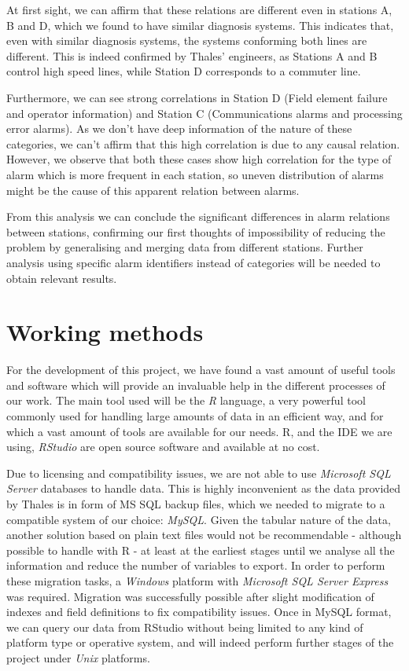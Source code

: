\clearpage

At first sight, we can affirm that these relations are different even in stations A, B and D, which we found to have similar diagnosis systems. This indicates that, even with similar diagnosis systems, the systems conforming both lines are different. This is indeed confirmed by Thales' engineers, as Stations A and B control high speed lines, while Station D corresponds to a commuter line.

Furthermore, we can see strong correlations in Station D (Field element failure and operator information) and Station C (Communications alarms and processing error alarms). As we don't have deep information of the nature of these categories, we can't affirm that this high correlation is due to any causal relation. However, we observe that both these cases show high correlation for the type of alarm which is more frequent in each station, so uneven distribution of alarms might be the cause of this apparent relation between alarms.

From this analysis we can conclude the significant differences in alarm relations between stations, confirming our first thoughts of impossibility of reducing the problem by generalising and merging data from different stations. Further analysis using specific alarm identifiers instead of categories will be needed to obtain relevant results.

\clearpage

\section{Working methods}
\label{sec:methods} For the development of this project, we have found a vast amount of useful tools and software which will provide an invaluable help in the different processes of our work. The main tool used will be the \emph{R} language\cite{ihaka1996r}, a very powerful tool commonly used for handling large amounts of data in an efficient way, and for which a vast amount of tools are available for our needs. R, and the IDE we are using, \emph{RStudio}\cite{racine2012rstudio} are open source software and available at no cost.

Due to licensing and compatibility issues, we are not able to use \emph{Microsoft SQL Server} databases to handle data. This is highly inconvenient as the data provided by Thales is in form of MS SQL backup files, which we needed to migrate to a compatible system of our choice: \emph{MySQL}. Given the tabular nature of the data, another solution based on plain text files would not be recommendable - although possible to handle with R - at least at the earliest stages until we analyse all the information and reduce the number of variables to export. In order to perform these migration tasks, a \emph{Windows} platform with \emph{Microsoft SQL Server Express} was required. Migration was successfully possible after slight modification of indexes and field definitions to fix compatibility issues. Once in MySQL format, we can query our data from RStudio without being limited to any kind of platform type or operative system, and will indeed perform further stages of the project under \emph{Unix} platforms.

